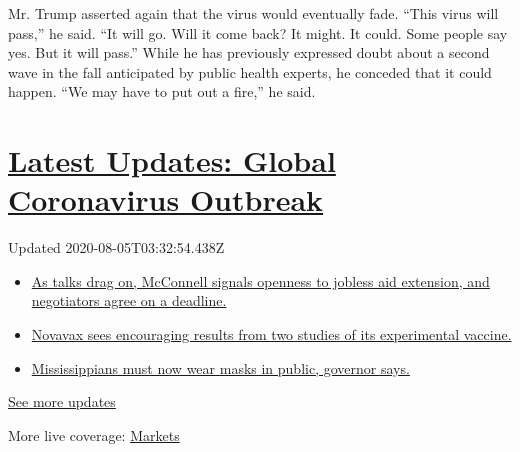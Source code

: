 Mr. Trump asserted again that the virus would eventually fade. ``This
virus will pass,'' he said. ``It will go. Will it come back? It might.
It could. Some people say yes. But it will pass.'' While he has
previously expressed doubt about a second wave in the fall anticipated
by public health experts, he conceded that it could happen. ``We may
have to put out a fire,'' he said.

\hypertarget{latest-updates-global-coronavirus-outbreak}{%
\section{\texorpdfstring{\href{https://www.nytimes.com/2020/08/04/world/coronavirus-cases.html?action=click\&pgtype=Article\&state=default\&region=MAIN_CONTENT_1\&context=storylines_live_updates}{Latest
Updates: Global Coronavirus
Outbreak}}{Latest Updates: Global Coronavirus Outbreak}}\label{latest-updates-global-coronavirus-outbreak}}

Updated 2020-08-05T03:32:54.438Z

\begin{itemize}
\tightlist
\item
  \href{https://www.nytimes.com/2020/08/04/world/coronavirus-cases.html?action=click\&pgtype=Article\&state=default\&region=MAIN_CONTENT_1\&context=storylines_live_updates\#link-762df92}{As
  talks drag on, McConnell signals openness to jobless aid extension,
  and negotiators agree on a deadline.}
\item
  \href{https://www.nytimes.com/2020/08/04/world/coronavirus-cases.html?action=click\&pgtype=Article\&state=default\&region=MAIN_CONTENT_1\&context=storylines_live_updates\#link-1228a480}{Novavax
  sees encouraging results from two studies of its experimental
  vaccine.}
\item
  \href{https://www.nytimes.com/2020/08/04/world/coronavirus-cases.html?action=click\&pgtype=Article\&state=default\&region=MAIN_CONTENT_1\&context=storylines_live_updates\#link-794484ed}{Mississippians
  must now wear masks in public, governor says.}
\end{itemize}

\href{https://www.nytimes.com/2020/08/04/world/coronavirus-cases.html?action=click\&pgtype=Article\&state=default\&region=MAIN_CONTENT_1\&context=storylines_live_updates}{See
more updates}

More live coverage:
\href{https://www.nytimes.com/live/2020/08/04/business/stock-market-today-coronavirus?action=click\&pgtype=Article\&state=default\&region=MAIN_CONTENT_1\&context=storylines_live_updates}{Markets}

